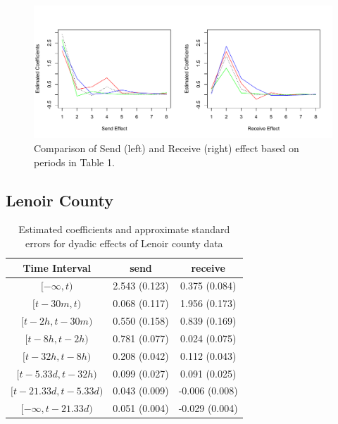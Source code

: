 \documentclass[a4paper]{article}
\begin{document}
\footnotesize
\begin{figure}[ht]
	\centering
	\includegraphics[width=1.1\textwidth]{Dareplot.pdf} 
	\caption{Comparison of Send (left) and Receive (right) effect based on periods in Table 1.}
	\label{fig:Emailplot}
\end{figure}
\newpage
\subsection{Lenoir County}
\footnotesize
\begin{table}[ht]
	\centering
	\begin{tabular}{ |c|cc| } 
		\hline 
		\textbf{Time Interval} &\textbf{send} & \textbf{receive} \\ 	
		\hline  $[-\infty, t)$&  2.543 (0.123)& 0.375 (0.084) \\  $[t-30 m, t)$ &  0.068 (0.117) &  1.956 (0.173) \\  $[t-2h, t-30m)$& 0.550 (0.158) & 0.839 (0.169)\\ $[t-8h, t-2h)$ & 0.781 (0.077)&  0.024 (0.075)\\ $[t-32h, t-8h)$& 0.208 (0.042)  &  0.112 (0.043)\\ $[t-5.33d, t-32h)$&  0.099 (0.027)& 0.091 (0.025)\\ $[t-21.33d, t-5.33d)$  & 0.043 (0.009) & -0.006 (0.008)\\ 
		$[-\infty, t-21.33d)$  & 0.051 (0.004)& -0.029 (0.004)  \\
		\hline
	\end{tabular}
	\caption {Estimated coefficients and approximate standard errors for dyadic effects of Lenoir county data}
	\label{table:nullLenoir}
\end{table}
\normalsize
\end{document}
